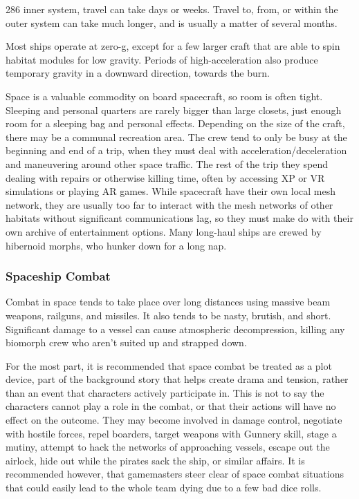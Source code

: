 286
inner system, travel can take days or weeks. Travel to, 
from, or within the outer system can take much longer, 
and is usually a matter of several months.

Most ships operate at zero-g, except for a few larger 
craft that are able to spin habitat modules for low 
gravity. Periods of high-acceleration also produce 
temporary gravity in a downward direction, towards 
the burn.

Space is a valuable commodity on board spacecraft, 
so room is often tight. Sleeping and personal quarters 
are rarely bigger than large closets, just enough room 
for a sleeping bag and personal effects. Depending 
on the size of the craft, there may be a communal 
recreation area. The crew tend to only be busy at the 
beginning and end of a trip, when they must deal with 
acceleration/deceleration and maneuvering around 
other space traffic. The rest of the trip they spend 
dealing with repairs or otherwise killing time, often 
by accessing XP or VR simulations or playing AR 
games. While spacecraft have their own local mesh 
network, they are usually too far to interact with the 
mesh networks of other habitats without significant 
communications lag, so they must make do with 
their own archive of entertainment options. Many 
long-haul ships are crewed by hibernoid morphs, who 
hunker down for a long nap.

\subsubsection{Spaceship Combat}

Combat in space tends to take place over long distances
using massive beam weapons, railguns, and
missiles. It also tends to be nasty, brutish, and short. 
Significant damage to a vessel can cause atmospheric 
decompression, killing any biomorph crew who aren't 
suited up and strapped down. 

For the most part, it is recommended that space 
combat be treated as a plot device, part of the background
story that helps create drama and tension,
rather than an event that characters actively participate
in. This is not to say the characters cannot play a
role in the combat, or that their actions will have no 
effect on the outcome. They may become involved in 
damage control, negotiate with hostile forces, repel 
boarders, target weapons with Gunnery skill, stage a 
mutiny, attempt to hack the networks of approaching
vessels, escape out the airlock, hide out while the
pirates sack the ship, or similar affairs. It is recommended
however, that gamemasters steer clear of
space combat situations that could easily lead to the 
whole team dying due to a few bad dice rolls.

